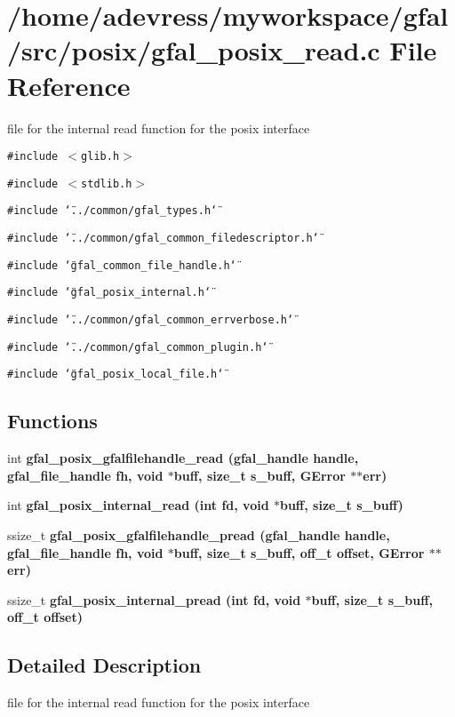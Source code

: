 \section{/home/adevress/myworkspace/gfal/src/posix/gfal\_\-posix\_\-read.c File Reference}
\label{gfal__posix__read_8c}
file for the internal read function for the posix interface 

{\tt \#include $<$glib.h$>$}\par
{\tt \#include $<$stdlib.h$>$}\par
{\tt \#include \char`\"{}../common/gfal\_\-types.h\char`\"{}}\par
{\tt \#include \char`\"{}../common/gfal\_\-common\_\-filedescriptor.h\char`\"{}}\par
{\tt \#include \char`\"{}gfal\_\-common\_\-file\_\-handle.h\char`\"{}}\par
{\tt \#include \char`\"{}gfal\_\-posix\_\-internal.h\char`\"{}}\par
{\tt \#include \char`\"{}../common/gfal\_\-common\_\-errverbose.h\char`\"{}}\par
{\tt \#include \char`\"{}../common/gfal\_\-common\_\-plugin.h\char`\"{}}\par
{\tt \#include \char`\"{}gfal\_\-posix\_\-local\_\-file.h\char`\"{}}\par
\subsection*{Functions}
\begin{CompactItemize}
\item 
int \bf{gfal\_\-posix\_\-gfalfilehandle\_\-read} (gfal\_\-handle handle, gfal\_\-file\_\-handle fh, void $\ast$buff, size\_\-t s\_\-buff, GError $\ast$$\ast$err)
\item 
int \bf{gfal\_\-posix\_\-internal\_\-read} (int fd, void $\ast$buff, size\_\-t s\_\-buff)
\item 
ssize\_\-t \bf{gfal\_\-posix\_\-gfalfilehandle\_\-pread} (gfal\_\-handle handle, gfal\_\-file\_\-handle fh, void $\ast$buff, size\_\-t s\_\-buff, off\_\-t offset, GError $\ast$$\ast$err)
\item 
ssize\_\-t \bf{gfal\_\-posix\_\-internal\_\-pread} (int fd, void $\ast$buff, size\_\-t s\_\-buff, off\_\-t offset)
\end{CompactItemize}


\subsection{Detailed Description}
file for the internal read function for the posix interface 

